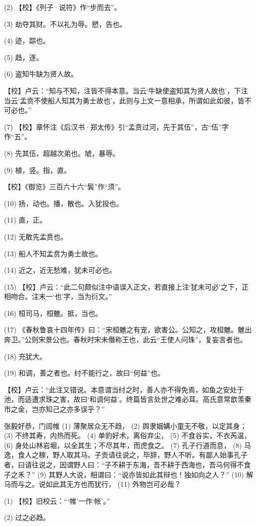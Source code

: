 \documentclass[12pt,UTF8]{ctexbook}
\begin{document}
(2) 【校】《列子·说符》作“步而去”。

(3) 劫夺其财。不以礼为辱。愬，告也。

(4) 迹，踪也。

(5) 趋，逐。

(6) 盗知牛缺为贤人故。

【校】卢云：“知与不知，注皆不得本意。当云‘牛缺使盗知其为贤人故也’，下注当云‘孟贲不使船人知其为勇士故也’，此则与上文一意相承，所谓如此如彼，皆不可必也。”

(7) 【校】章怀注《后汉书·郑太传》引“孟贲过河，先于其伍”，古“伍”字作“五”。

(8) 先其伍，超越次弟也。虓，暴辱。

(9) 植，竖。指，直。

【校】《御览》三百六十六“鬓”作“须”。

(10) 扬，动也。播，散也。入犹投也。

(11) 直，正。

(12) 无敢先孟贲也。

(13) 船人不知孟贲为勇士故也。

(14) 近之，近无愁难，犹未可必也。

(15) 【校】卢云：“此二句颇似注中语误入正文，若直接上注‘犹未可必’之下，正相吻合。注末一‘也’字，当为衍文。”

(16) 桓司马，桓魋。抵，当也。

(17) 《春秋鲁哀十四年传》曰：“宋桓魋之有宠，欲害公。公知之，攻桓魋。魋出奔卫。”公则宋景公也。春秋时宋未僭称王也，此云“王使人问珠”，复妄言者也。

(18) 充犹大。

(19) 和调，善之者也。纣不能行之，故曰“何益”也。

【校】卢云：“此注又错说。本意谓当纣之时，善人亦不得免焉，如鱼之安处于池，而适遭求珠之害，故曰‘和调何益’。终篇皆言处世之难必耳。高氏意常歆羡秦市之金，岂亦知己之亦多误乎？”

张毅好恭，门闾帷 (1) 薄聚居众无不趋， (2) 舆隶姻媾小童无不敬，以定其身； (3) 不终其寿，内热而死。 (4) 单豹好术，离俗弃尘， (5) 不食谷实，不衣芮温， (6) 身处山林岩堀，以全其生；不尽其年，而虎食之。 (7) 孔子行道而息， (8) 马逸，食人之稼，野人取其马。子贡请往说之，毕辞，野人不听。有鄙人始事孔子者，曰请往说之，因谓野人曰：“子不耕于东海，吾不耕于西海也，吾马何得不食子之禾？” (9) 其野人大说，相谓曰：“说亦皆如此其辩也！独如向之人？” (10) 解马而与之。说如此其无方也而犹行， (11) 外物岂可必哉？

(1) 【校】旧校云：“‘帷’一作‘帐’。”

(2) 过之必趋。
\end{document}
